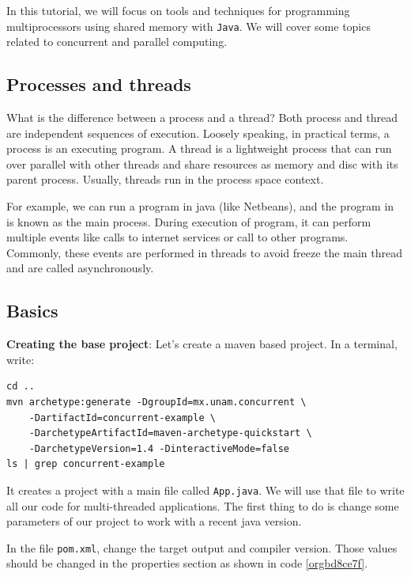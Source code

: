 \documentclass{latex/classes/thesis}
\begin{document}
In this tutorial, we will focus on tools and techniques for programming
multiprocessors using shared memory with \texttt{Java}. We will cover some topics
related to concurrent and parallel computing.


\subsection{Processes and threads}
\label{sec:orgc1adbcf}

What is the difference between a process and a thread? Both process and
thread are independent sequences of execution. Loosely speaking, in practical
terms, a process is an executing program. A thread is a lightweight process
that can run over parallel with other threads and share resources as memory
and disc with its parent process. Usually, threads run in the process space
context.

For example, we can run a program in java (like Netbeans), and the
program in is known as the main process. During execution of program, it
can perform multiple events like calls to internet services or call to other
programs. Commonly, these events are performed in threads to avoid freeze the
main thread and are called asynchronously.

\subsection{Basics}
\label{sec:org8d63095}


\textbf{Creating the base project}: Let's create a maven based project. In a terminal,
write:

\begin{lstlisting}
cd ..
mvn archetype:generate -DgroupId=mx.unam.concurrent \
    -DartifactId=concurrent-example \
    -DarchetypeArtifactId=maven-archetype-quickstart \
    -DarchetypeVersion=1.4 -DinteractiveMode=false
ls | grep concurrent-example
\end{lstlisting}

It creates a project with a main file called \texttt{App.java}. We will use that file
to write all our code for multi-threaded applications. The first thing to do
is change some parameters of our project to work with a recent java version.

In the file \texttt{pom.xml}, change the target output and compiler version. Those
values should be changed in the properties section as shown in code
\ref{orgbd8ce7f}.
\end{document}
